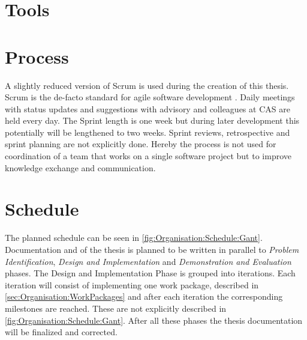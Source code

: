 \section{Tools}
\label{sec:Organisation:Tools}


\section{Process}
\label{sec:Organisation:Process}

A slightly reduced version of Scrum is used during the creation of this thesis. Scrum is the de-facto standard for agile software development \cite{glogerScrumPradigmenwechselIm2010}. Daily meetings with status updates and suggestions with advisory and colleagues at CAS are held every day. The Sprint length is one week but during later development this potentially will be lengthened to two weeks. Sprint reviews, retrospective and sprint planning are not explicitly done. Hereby the process is not used for coordination of a team that works on a single software project but to improve knowledge exchange and communication.

\section{Schedule}
\label{sec:Organisation:Schedule}

The planned schedule can be seen in \ref{fig:Organisation:Schedule:Gant}. Documentation and of the thesis is planned to be written in parallel to  \emph{Problem Identification}, \emph{Design and Implementation} and \emph{Demonstration and Evaluation} phases. The Design and Implementation Phase is grouped into iterations. Each iteration will consist of implementing one work package, described in \ref{sec:Organisation:WorkPackages} and after each iteration the corresponding milestones are reached. These are not explicitly described in \ref{fig:Organisation:Schedule:Gant}. After all these phases the thesis documentation will be finalized and corrected. 

